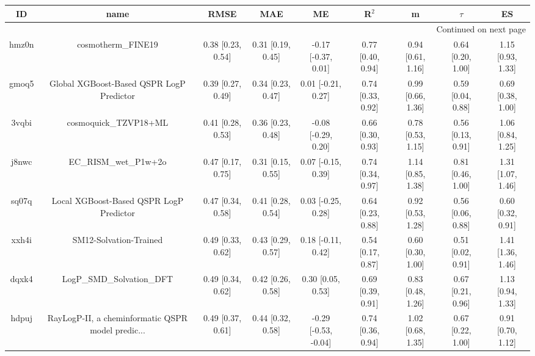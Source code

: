 \documentclass{article}
\begin{document}
\begin{center}
\scriptsize
\begin{longtable}{|ccccccccc|}
\toprule
    ID &                                               name &               RMSE &                MAE &                    ME &              R$^2$ &                    m &               $\tau$ &                    ES \\
\midrule
\endhead
\midrule
\multicolumn{9}{r}{{Continued on next page}} \\
\midrule
\endfoot

\bottomrule
\endlastfoot
 hmz0n &                                 cosmotherm\_FINE19 &  0.38 [0.23, 0.54] &  0.31 [0.19, 0.45] &   -0.17 [-0.37, 0.01] &  0.77 [0.40, 0.94] &    0.94 [0.61, 1.16] &    0.64 [0.20, 1.00] &     1.15 [0.93, 1.33] \\
 gmoq5 &           Global XGBoost-Based QSPR LogP Predictor &  0.39 [0.27, 0.49] &  0.34 [0.23, 0.47] &    0.01 [-0.21, 0.27] &  0.74 [0.33, 0.92] &    0.99 [0.66, 1.36] &    0.59 [0.04, 0.88] &     0.69 [0.38, 1.00] \\
 3vqbi &                              cosmoquick\_TZVP18+ML &  0.41 [0.28, 0.53] &  0.36 [0.23, 0.48] &   -0.08 [-0.29, 0.20] &  0.66 [0.30, 0.93] &    0.78 [0.53, 1.15] &    0.56 [0.13, 0.91] &     1.06 [0.84, 1.25] \\
 j8nwc &                              EC\_RISM\_wet\_P1w+2o &  0.47 [0.17, 0.75] &  0.31 [0.15, 0.55] &    0.07 [-0.15, 0.39] &  0.74 [0.34, 0.97] &    1.14 [0.85, 1.38] &    0.81 [0.46, 1.00] &     1.31 [1.07, 1.46] \\
 sq07q &            Local XGBoost-Based QSPR LogP Predictor &  0.47 [0.34, 0.58] &  0.41 [0.28, 0.54] &    0.03 [-0.25, 0.28] &  0.64 [0.23, 0.88] &    0.92 [0.53, 1.28] &    0.56 [0.06, 0.88] &     0.60 [0.32, 0.91] \\
 xxh4i &                             SM12-Solvation-Trained &  0.49 [0.33, 0.62] &  0.43 [0.29, 0.57] &    0.18 [-0.11, 0.42] &  0.54 [0.17, 0.87] &    0.60 [0.30, 1.00] &    0.51 [0.02, 0.91] &     1.41 [1.36, 1.46] \\
 dqxk4 &                          LogP\_SMD\_Solvation\_DFT &  0.49 [0.34, 0.62] &  0.42 [0.26, 0.58] &     0.30 [0.05, 0.53] &  0.69 [0.39, 0.91] &    0.83 [0.48, 1.26] &    0.67 [0.21, 0.96] &     1.13 [0.94, 1.33] \\
 hdpuj &  RayLogP-II, a cheminformatic QSPR model predic... &  0.49 [0.37, 0.61] &  0.44 [0.32, 0.58] &  -0.29 [-0.53, -0.04] &  0.74 [0.36, 0.94] &    1.02 [0.68, 1.35] &    0.67 [0.22, 1.00] &     0.91 [0.70, 1.12] \\

\end{longtable}
\end{center}
\end{document}
